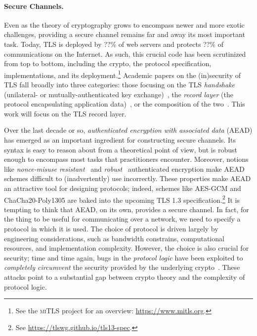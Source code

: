 \paragraph{Secure Channels.}
Even as the theory of cryptography grows to encompass newer and more exotic
challenges, providing a secure channel remains far and away its most important
task.
%
Today, TLS is deployed by ??\% of web servers and protects ??\% of
communications on the Internet. As such, this crucial code has been scrutinized
from top to bottom, including the crypto, the protocol specification,
implementations, and its deployment.\footnote{ See the \textsc{miTLS} project
for an overview: \url{https://www.mitls.org}.}
%
Academic papers on the (in)security of TLS fall broadly into three categories:
those focusing on the TLS \emph{handshake} (unilateral- or
mutually-authenticated key exchange)~\cite{BNF+14,others}, the \emph{record
layer} (the protocol encapsulating application data)~\cite{PRS11}, or the
composition of the two~\cite{JKSS12,KPW13}. This work will focus on the TLS
record layer.

Over the last decade or so, \emph{authenticated encryption with associated data}
(AEAD) has emerged as an important ingredient for constructing secure channels.
%
Its syntax is easy to reason about from a theoretical point of view, but is
robust enough to encompass most tasks that practitioners encounter. Moreover,
notions like \emph{nonce-misuse resistant}~\cite{RS07} and
\emph{robust}~\cite{HKR14} authenticated encryption make AEAD schemes difficult
to (inadvertently) use incorrectly. These properties make AEAD an attractive
tool for designing protocols; indeed, schemes like AES-GCM and
ChaCha20\mbox{-}Poly1305 are baked into the upcoming TLS 1.3
specification.\footnote{ See \url{https://tlswg.github.io/tls13-spec}.}
%
%
It is tempting to think that AEAD, on its own, provides a secure channel. In
fact, for the thing to be useful for communicating over a network, we need to
specify a protocol in which it is used. The choice of protocol is driven largely
by engineering considerations, such as bandwidth constrains, computational
resources, and implementation complexity. However, the choice is also crucial
for security; time and time again, bugs in the \emph{protocol logic} have been
exploited to \emph{completely circumvent} the security provided by the
underlying crypto~\cite{BKN02}. These attacks point to a substantial gap between
crypto theory and the complexity of protocol logic.


